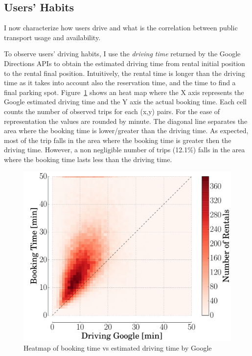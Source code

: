 \subsection{Users' Habits}

I now characterize how users drive and what is the correlation between public transport usage and availability.

To observe users' driving habits, I use the \textit{driving time} returned by the Google Directions APIs to {obtain} the estimated {driving} time from {rental initial position to the rental final position}. Intuitively, the {rental} time is longer than the driving time as it takes into account also the {reservation} time, and the time to find a final parking spot. Figure~\ref{fig:3_5_heatmap_driving} shows an heat map where the X axis represents the Google estimated driving time and the Y axis the actual booking time. Each cell counts the number of {observed} trips {for each (x,y) pairs}.
For the ease of representation the values are rounded by minute. The diagonal line separates the area where the booking time is lower/greater than the driving time. As expected, most of the trip falls in the area where the booking time is greater then the driving time. However, a non negligible number of trips (12.1\%) falls in the area where the booking time lasts less than the driving time. 

\begin{figure}[h!]
	\centering
	\includegraphics[width=0.85\columnwidth]{figures/car2go_faster_driving.pdf}
	\caption{Heatmap of booking time vs estimated driving time by Google\label{fig:3_5_heatmap_driving}}
\end{figure}


